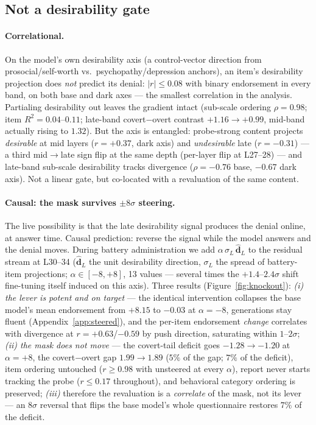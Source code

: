 \documentclass[11pt]{article}
\begin{document}
\subsection{Not a desirability gate}
\label{sec:filter-desir}

\paragraph{Correlational.}
On the model's own desirability axis (a control-vector direction from prosocial/self-worth
vs.\ psychopathy/depression anchors), an item's desirability projection does \emph{not}
predict its denial: $|r| \le 0.08$ with binary endorsement in every band, on both base and
dark axes --- the smallest correlation in the analysis. Partialing desirability out leaves
the gradient intact (sub-scale ordering $\rho = 0.98$; item $R^2 = 0.04$--$0.11$; late-band
covert$-$overt contrast $+1.16 \to +0.99$, mid-band actually rising to $1.32$). But the axis
is entangled: probe-strong content projects \emph{desirable} at mid layers ($r=+0.37$, dark
axis) and \emph{undesirable} late ($r=-0.31$) --- a third mid$\to$late sign flip at the same
depth (per-layer flip at L27--28) --- and late-band sub-scale desirability tracks divergence
($\rho = -0.76$ base, $-0.67$ dark axis). Not a linear gate, but co-located with a
revaluation of the same content.

\paragraph{Causal: the mask survives $\pm8\sigma$ steering.}
The live possibility is that the late desirability signal produces the denial online, at
answer time. Causal prediction: reverse the signal while the model answers and the denial
moves. During battery administration we add $\alpha\,\sigma_L\,\hat{\mathbf{d}}_L$ to the
residual stream at L30--34 ($\hat{\mathbf{d}}_L$ the unit desirability direction, $\sigma_L$
the spread of battery-item projections; $\alpha \in [-8,+8]$, 13 values --- several times
the $+1.4$--$2.4\sigma$ shift fine-tuning itself induced on this axis). Three results
(Figure~\ref{fig:knockout}): \emph{(i) the lever is potent and on target} --- the identical
intervention collapses the base model's mean endorsement from $+8.15$ to $-0.03$ at
$\alpha=-8$, generations stay fluent (Appendix~\ref{app:steered}), and the per-item
endorsement \emph{change} correlates with divergence at $r = +0.63$/$-0.59$ by push
direction, saturating within $1$--$2\sigma$; \emph{(ii) the mask does not move} --- the
covert-tail deficit goes $-1.28 \to -1.20$ at $\alpha=+8$, the covert$-$overt gap
$1.99 \to 1.89$ ($5\%$ of the gap; $7\%$ of the deficit), item ordering untouched
($r \ge 0.98$ with unsteered at every $\alpha$), report never starts tracking the probe
($r \le 0.17$ throughout), and behavioral category ordering is preserved; \emph{(iii)}
therefore the revaluation is a \emph{correlate} of the mask, not its lever --- an
$8\sigma$ reversal that flips the base model's whole questionnaire restores $7\%$ of the
deficit.
\end{document}
